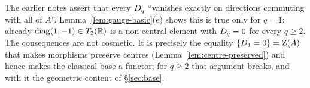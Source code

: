 \begin{warning}\label{warn:vanishing}
The earlier notes assert that every $D_q$ ``vanishes exactly on directions
commuting with all of $A$''.  Lemma~\ref{lem:gauge-basic}(e) shows this is true
only for $q=1$: already $\operatorname{diag}(1,-1)\in T_2(\mathbb{R})$ is a
non-central element with $D_q=0$ for every $q\ge2$.  The consequences are
not cosmetic.  It is precisely the equality $\{D_1=0\}=\operatorname{Z}(A)$ that makes
morphisms preserve centres (Lemma~\ref{lem:centre-preserved}) and hence makes
the classical base a functor; for $q\ge2$ that argument breaks, and with it the
geometric content of \S\ref{sec:base}.
\end{warning}
